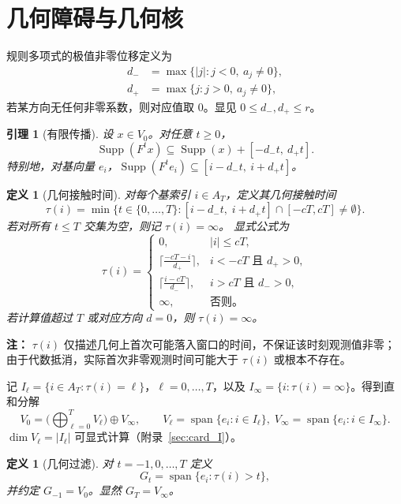 \documentclass[11pt,a4paper]{ctexart}
\newtheorem{lemma}[theorem]{引理}
\newtheorem{definition}[theorem]{定义}
\DeclareMathOperator{\spanop}{span}
\DeclareMathOperator{\Supp}{Supp}
\begin{document}
\section{几何障碍与几何核}
规则多项式的极值非零位移定义为
\begin{align*}
    d_- &= \max\{|j|: j<0,\ a_j\neq 0\}, \\
    d_+ &= \max\{j: j>0,\ a_j\neq 0\},
\end{align*}
若某方向无任何非零系数，则对应值取 \(0\)。显见 \(0\le d_-,d_+\le r\)。

\begin{lemma}[有限传播]\label{lem:finite_propagation}
设 \(x\in V_0\)。对任意 \(t\ge 0\)，
\[
\Supp(F^t x) \subseteq \Supp(x) + [-d_- t,\ d_+ t].
\]
特别地，对基向量 \(e_i\)，\(\Supp(F^t e_i)\subseteq [i-d_- t,\ i+d_+ t]\)。
\end{lemma}

\begin{definition}[几何接触时间]\label{def:tau}
对每个基索引 \(i\in A_T\)，定义其\emph{几何接触时间}
\[
\tau(i) = \min\{ t\in\{0,\dots,T\} : [i-d_-t,\; i+d_+t] \cap [-cT,cT] \neq \emptyset \}.
\]
若对所有 \(t\le T\) 交集为空，则记 \(\tau(i)=\infty\)。
显式公式为
\[
\tau(i)=
\begin{cases}
0, & |i|\le cT,\\[4pt]
\displaystyle\Big\lceil\frac{-cT-i}{d_+}\Big\rceil, & i< -cT \text{ 且 } d_+>0,\\[10pt]
\displaystyle\Big\lceil\frac{i-cT}{d_-}\Big\rceil, & i>cT \text{ 且 } d_->0,\\[10pt]
\infty, & \text{否则。}
\end{cases}
\]
若计算值超过 \(T\) 或对应方向 \(d=0\)，则 \(\tau(i)=\infty\)。
\end{definition}

\textbf{注：} \(\tau(i)\) 仅描述几何上首次可能落入窗口的时间，不保证该时刻观测值非零；由于代数抵消，实际首次非零观测时间可能大于 \(\tau(i)\) 或根本不存在。

记 \(I_\ell = \{i\in A_T : \tau(i)=\ell\}\)，\(\ell=0,\dots,T\)，以及 \(I_\infty = \{i:\tau(i)=\infty\}\)。得到直和分解
\[
V_0 = \Big( \bigoplus_{\ell=0}^{T} V_\ell \Big) \oplus V_\infty,\qquad
V_\ell = \spanop\{e_i : i\in I_\ell\},\; V_\infty = \spanop\{e_i : i\in I_\infty\}.
\]
\(\dim V_\ell = |I_\ell|\) 可显式计算（附录~\ref{sec:card_I}）。

\begin{definition}[几何过滤]\label{def:geo_filtration}
对 \(t=-1,0,\dots,T\) 定义
\[
G_t = \spanop\{ e_i : \tau(i) > t \},
\]
并约定 \(G_{-1}=V_0\)。显然 \(G_T = V_\infty\)。
\end{definition}
\end{document}
